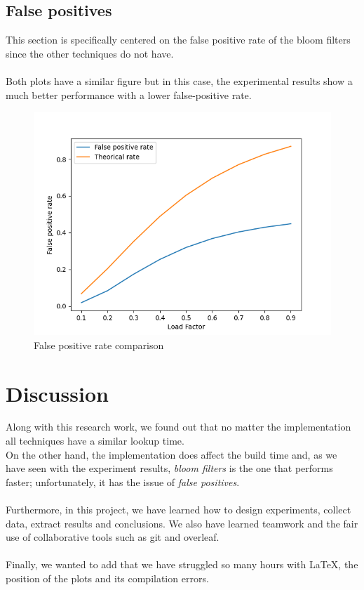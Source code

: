 \documentclass{article}
\begin{document}
    \subsection*{False positives}
        This section is specifically centered on the false positive rate of the bloom filters since the other techniques do not have. \\\\
        Both plots have a similar figure but in this case, the experimental results show a much better performance with a lower false-positive rate. 
        
        \begin{figure}[!h]
        \begin{center}
          \includegraphics[width=\linewidth]{images/loadFactor_vs_falsePositives.png}
          \caption{False positive rate comparison}\label{fig:plot16}
        \endminipage
        \end{center}
        \end{figure}

\section{Discussion}
Along with this research work, we found out that no matter the implementation all techniques have a similar lookup time. \\
On the other hand, the implementation does affect the build time and, as we have seen with the experiment results, \textit{bloom filters} is the one that performs faster; unfortunately, it has the issue of \textit{false positives}. \\\\
Furthermore, in this project, we have learned how to design experiments, collect data, extract results and conclusions. We also have learned teamwork and the fair use of collaborative tools such as git and overleaf. \\\\
Finally, we wanted to add that we have struggled so many hours with LaTeX, the position of the plots and its compilation errors.


    \printbibliography
\end{document}
